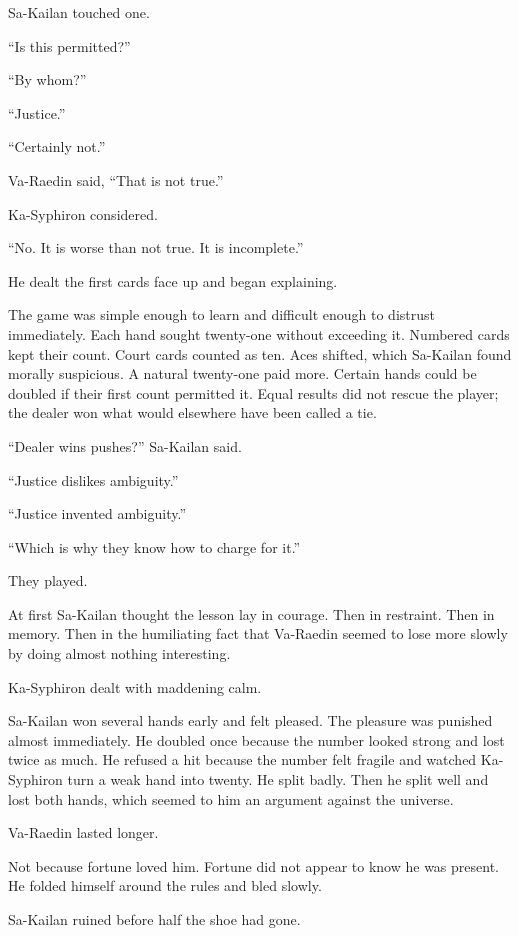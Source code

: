 Sa-Kailan touched one.\par
“Is this permitted?”\par
“By whom?”\par
“Justice.”\par
“Certainly not.”\par
Va-Raedin said, “That is not true.”\par
Ka-Syphiron considered.\par
“No. It is worse than not true. It is incomplete.”\par
He dealt the first cards face up and began explaining.\par
The game was simple enough to learn and difficult enough to distrust immediately. Each hand sought twenty-one without exceeding it. Numbered cards kept their count. Court cards counted as ten. Aces shifted, which Sa-Kailan found morally suspicious. A natural twenty-one paid more. Certain hands could be doubled if their first count permitted it. Equal results did not rescue the player; the dealer won what would elsewhere have been called a tie.\par
“Dealer wins pushes?” Sa-Kailan said.\par
“Justice dislikes ambiguity.”\par
“Justice invented ambiguity.”\par
“Which is why they know how to charge for it.”\par
They played.\par
At first Sa-Kailan thought the lesson lay in courage. Then in restraint. Then in memory. Then in the humiliating fact that Va-Raedin seemed to lose more slowly by doing almost nothing interesting.\par
Ka-Syphiron dealt with maddening calm.\par
Sa-Kailan won several hands early and felt pleased. The pleasure was punished almost immediately. He doubled once because the number looked strong and lost twice as much. He refused a hit because the number felt fragile and watched Ka-Syphiron turn a weak hand into twenty. He split badly. Then he split well and lost both hands, which seemed to him an argument against the universe.\par
Va-Raedin lasted longer.\par
Not because fortune loved him. Fortune did not appear to know he was present. He folded himself around the rules and bled slowly.\par
Sa-Kailan ruined before half the shoe had gone.\par
